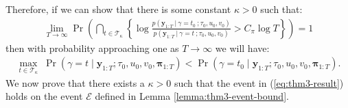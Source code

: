 Therefore, if we can show that there is some constant $\kappa > 0$ such that:
\begin{align}
    \lim_{T\to\infty}\Pr\left(\bigcap_{t\in\mathcal{T}_{\kappa}}\left\{ \log \frac{p(\mathbf{y}_{1:T} \:|\:\gamma = t_0 \:; \tau_0, u_0, v_0)}{p(\mathbf{y}_{1:T} \:|\:\gamma = t \:; \tau_0, u_0, v_0)} > C_\pi \log T\right\}\right) = 1 \label{eq:thm3-result}
\end{align}
then with probability approaching one as $T \to \infty$ we will have:
\begin{align*}
    \max_{t\in\mathcal{T}_{\kappa}} \; \Pr(\gamma = t  \;|\; \mathbf{y}_{1:T} ; \tau_0, u_0, v_0,\boldsymbol{\pi}_{1:T}) < \Pr(\gamma = t_0  \;|\; \mathbf{y}_{1:T} ; \tau_0, u_0, v_0,\boldsymbol{\pi}_{1:T}).
\end{align*}
We now prove that there exists a $\kappa > 0$ such that the event in (\ref{eq:thm3-result}) holds on the event $\mathcal{E}$ defined in Lemma \ref{lemma:thm3-event-bound}.


